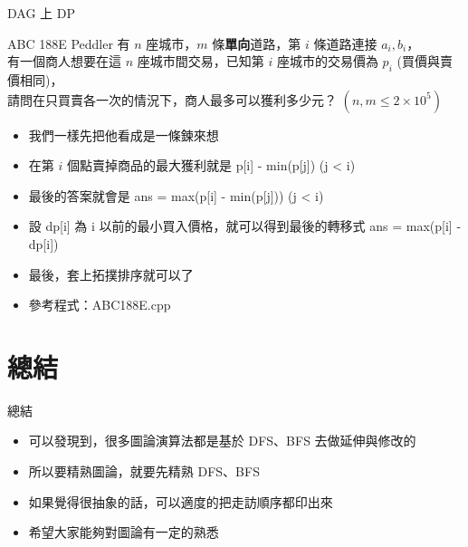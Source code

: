 \documentclass[aspectratio=169]{beamer}
\begin{document}
    \begin{frame}{DAG 上 DP}
        \begin{block}{ABC 188E Peddler}
            有 $n$ 座城市，$m$ 條\textbf{單向}道路，第 $i$ 條道路連接 $a_i, b_i$，\\
            有一個商人想要在這 $n$ 座城市間交易，已知第 $i$ 座城市的交易價為 $p_i$ (買價與賣價相同)，\\
            請問在只買賣各一次的情況下，商人最多可以獲利多少元？ $(n, m \le 2 \times 10^5)$
        \end{block}

        \begin{itemize}
            \item<1-> 我們一樣先把他看成是一條鍊來想
            \item<2-> 在第 $i$ 個點賣掉商品的最大獲利就是 p[i] - min(p[j]) (j < i)
            \item<3-> 最後的答案就會是 ans = max(p[i] - min(p[j])) (j < i)
            \item<4-> 設 dp[i] 為 i 以前的最小買入價格，就可以得到最後的轉移式 ans = max(p[i] - dp[i])
            \item<5-> 最後，套上拓撲排序就可以了
            \item<5-> 參考程式：ABC188E.cpp
        \end{itemize}
    \end{frame}

    \section{總結}

    \begin{frame}{總結}
        \begin{itemize}
            \item 可以發現到，很多圖論演算法都是基於 DFS、BFS 去做延伸與修改的
            \item 所以要精熟圖論，就要先精熟 DFS、BFS
            \item 如果覺得很抽象的話，可以適度的把走訪順序都印出來
            \item 希望大家能夠對圖論有一定的熟悉
        \end{itemize}
    \end{frame}
\end{document}
